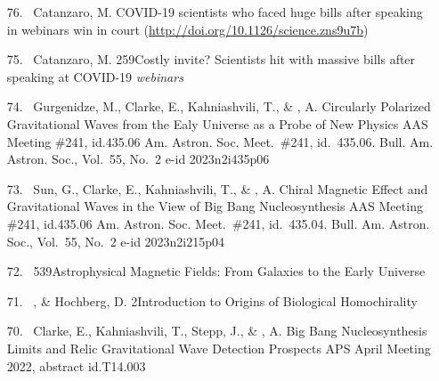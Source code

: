 \begin{itemize}

\item[{76.}~]
Catanzaro, M. %
{COVID-19 scientists who faced huge bills after speaking in webinars win in court}
{(\url{http://doi.org/10.1126/science.zns9u7b})}

\item[{75.}~]
Catanzaro, M.
{259}{Costly invite? Scientists hit with massive bills after speaking at COVID-19 {\em webinars}}

\item[{74.}~]
Gurgenidze, M., Clarke, E., Kahniashvili, T., \& \Brandenburg, A.
{Circularly Polarized Gravitational Waves from the Ealy Universe as a Probe of New Physics}
{AAS Meeting \#241, id.435.06}
{Am. Astron. Soc. Meet.~\#241, id.~435.06. Bull. Am. Astron. Soc., Vol.~55, No.~2 e-id 2023n2i435p06}

\item[{73.}~]
Sun, G., Clarke, E., Kahniashvili, T., \& \Brandenburg, A.
{Chiral Magnetic Effect and Gravitational Waves in the View of Big Bang Nucleosynthesis}
{AAS Meeting \#241, id.435.06}
{Am. Astron. Soc. Meet.~\#241, id.~435.04. Bull. Am. Astron. Soc., Vol.~55, No.~2 e-id 2023n2i215p04}

\item[{72.}~]
\Brandenburg{}
{539}{Astrophysical Magnetic Fields: From Galaxies to the Early Universe}

\item[{71.}~]
\Brandenburg, \& Hochberg, D.
{2}{Introduction to Origins of Biological Homochirality}

\item[{70.}~]
Clarke, E., Kahniashvili, T., Stepp, J., \& \Brandenburg, A.
{Big Bang Nucleosynthesis Limits and Relic Gravitational Wave Detection Prospects}
{APS April Meeting 2022, abstract id.T14.003}


\end{itemize}
